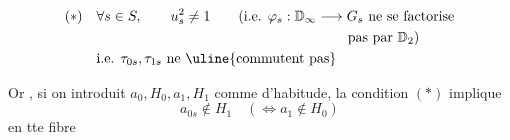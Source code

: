 
\[
\begin{aligned}
(\ast)\quad &\forall s\in S,\qquad u_s^2\ne1\qquad
(\text{i.e. }\varphi_s:\mathbb D_\infty\longrightarrow G_s\ \text{ne se factorise}\\
&\hspace{18em}\text{pas par }\mathbb D_2)\\
&\text{i.e. }\tau_{0s},\tau_{1s}\text{ ne \uline{commutent pas}}
\end{aligned}
\]


Or , si on introduit $a_0,H_0,a_1,H_1$ comme  d'habitude, la condition $(\ast)$ implique
\[
a_{0s}\notin H_1\quad(\Longleftrightarrow{}a_1\notin H_0)
\]
 en tte fibre

